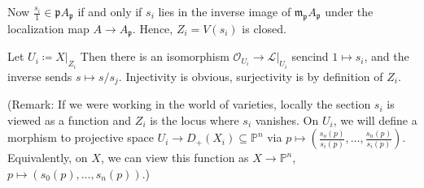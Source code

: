 Now $\frac{s_i}{1} \in \mathfrak{p}A_{\mathfrak{p}}$ if and only if $s_i$ lies in the
inverse image of $\mathfrak{m}_{\mathfrak{p}} A_{\mathfrak{p}}$ under the localization
map $A\to A_{\mathfrak{p}}$. Hence, $Z_i = V(s_i)$ is closed.

Let $U_i\coloneqq X|_{Z_i}$ Then there is an isomorphism $\mathcal{O}_{U_i} \to \mathcal{L}|_{U_i}$
sencind $1\mapsto s_i$, and the inverse sends $s\mapsto s/s_j$. Injectivity is obvious,
surjectivity is by definition of $Z_i$.

(Remark: If we were working in the world of varieties, locally the section $s_i$ is
viewed as a function and $Z_i$ is the locus where $s_i$ vanishes. On $U_i$, we will
define a morphism to projective space $U_i\to D_+(X_i) \subseteq \mathbb{P}^n$
via $p\mapsto (\frac{s_o(p)}{s_i(p)}, \ldots, \frac{s_n(p)}{s_i(p)})$. Equivalently,
on $X$, we can view this function as $X\to \mathbb{P}^n$, $p\mapsto (s_0(p), \ldots, s_n(p))$.)
